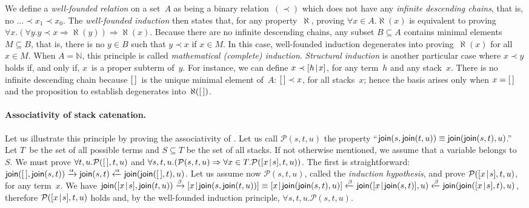 We define a \emph{well\hyp{}founded relation} on a set~\(A\) as being
a binary relation~\((\prec)\) which does not have any \emph{infinite
  descending chains}, that is, no \(\dots \prec x_1 \prec x_0\). The
\emph{well\hyp{}founded induction} then states that, for any
property~\(\aleph\), proving \(\forall x \in A.\aleph(x)\) is
equivalent to proving \(\forall x.(\forall y.y \prec x \Rightarrow
\aleph(y)) \Rightarrow \aleph(x)\). Because there are no infinite
descending chains, any subset \({B \subseteq A}\) contains minimal
elements \({M \subseteq B}\), that is, there is no \({y \in B}\) such
that \({y \prec x}\) if \({x \in M}\). In this case, well\hyp{}founded
induction degenerates into proving~\(\aleph(x)\) for all \({x \in
  M}\). When \({A=\mathbb{N}}\), this principle is called
\emph{mathematical (complete) induction}. \emph{Structural induction}
is another particular case where \({x \prec y}\) holds if, and only
if, \(x\)~is a proper subterm of~\(y\). For instance, we can define
\(x \prec [{h}\!\mid\!{x}]\), for any term~\(h\) and any stack~\(x\). There
is no infinite descending chain because \([\,]\)~is the unique minimal
element of~\(A\): \({[\,] \prec x}\), for all stacks~\(x\); hence the
basis arises only when \({x=[\,]}\) and the proposition to establish
degenerates into~\(\aleph([\,])\).

\medskip

\paragraph{Associativity of stack catenation.}

Let us illustrate this principle by proving the associativity of
. Let us call \(\mathcal{P}(s,t,u)\) the property
``\(\textsf{join}(s,\textsf{join}(t,u)) \equiv
\textsf{join}(\textsf{join}(s,t),u)\).'' Let \(T\)~be the set of all
possible terms and \({S \subseteq T}\) be the set of all stacks. If
not otherwise mentioned, we assume that a variable belongs
to~\(S\). We must prove \(\forall t,u.\mathcal{P}([\,],t,u)\) and
\(\forall s,t,u.(\mathcal{P}(s,t,u) \Rightarrow \forall x \in
T.\mathcal{P}([{x}\!\mid\!{s}],t,u))\). The first is straightforward:
\(\textsf{join}([\,],\textsf{join}(s,t)) \xrightarrow{\smash{\alpha}}
\textsf{join}(s,t) \xleftarrow{\smash{\alpha}}
\textsf{join}(\textsf{join}([\,],t),u)\). Let us assume now
\(\mathcal{P}(s,t,u)\), called the \emph{induction hypothesis}, and
prove \(\mathcal{P}([{x}\!\mid\!{s}],t,u)\), for any term~\(x\). We have
\(\fun{join}(\cons{x}{s},\fun{join}(t,u)) \smashedrightarrow{\beta}
\cons{x}{\fun{join}(s,\fun{join}(t,u))} \equiv
\cons{x}{\fun{join}(\fun{join}(s,t),u)} \smashedleftarrow{\beta}
\fun{join}(\cons{x}{\fun{join}(s,t)},u) \smashedleftarrow{\beta}
\fun{join}(\fun{join}(\cons{x}{s},t),u)\), therefore
\(\mathcal{P}([{x}\!\mid\!{s}],t,u)\) holds and, by the well\hyp{}founded
induction principle, \(\forall s,t,u.\mathcal{P}(s,t,u)\).

